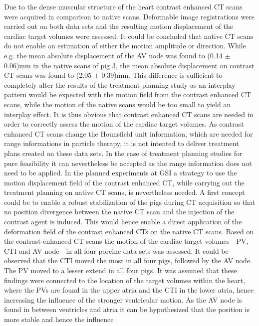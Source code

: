 \documentclass[type=dr, dr=rernat, accentcolor=tud7b,colorbacktitle, bigchapter, openright, twoside, 12pt ]{tudthesis}
\begin{document}
Due to the dense muscular structure of the heart contrast enhanced CT scans were acquired in comparison to native scans. Deformable image 
registrations were carried out on both data sets and the resulting motion displacement of the cardiac target volumes were assessed. It 
could be concluded that native CT scans do not enable an estimation of either the motion amplitude or direction. While e.g. the mean absolute displacement 
of the AV node was found to (0.14 $\pm$ 0.06)mm in the native scans of pig 3, the mean absolute displacement on contrast CT scans was found to 
(2.05 $\pm$ 0.39)mm. This difference is sufficient to completely alter the results of the treatment planning study as
an interplay pattern would be expected with the motion field from the contrast enhanced CT scans, while the motion of the native scans would 
be too small to yield an interplay effect. 
It is thus obvious that contrast enhanced CT scans are needed in order to correctly assess the motion of the cardiac target volumes. 
As contrast enhanced CT scans change the Hounsfield unit information, which are needed for range informations in particle therapy, it is 
not intented to deliver treatment plans created on these data sets. In the case of treatment planning studies for pure feasibility  
it can nevertheless be accepted as the range information does not need to be applied. In the planned experiments at GSI a strategy to use 
the motion displacement field of the contrast enhanced CT, while carrying out the treatment planning on native CT scans, is nevertheless needed. 
A first concept could be to enable a robust stabilization of the pigs during CT acquisition so that no position divergence between the native 
CT scan and the injection of the contrast agent is induced. This would hence enable a direct application of the 
deformation field of the contrast enhanced CTs on the native CT scans.\newline
\newline
Based on the contrast enhanced CT scans the motion of the cardiac target volumes - PV, CTI and AV node - in all four porcine 
data sets was assessed. It could be observed that the CTI moved the most in all four pigs, followed by the AV node. The PV moved to a lesser 
extend in all four pigs. It was assumed that these findings were connected to the location of the target volumes within the heart, where 
the PVs are found in the upper atria and the CTI in the lower atria, hence increasing the influence of the stronger ventricular motion. 
As the AV node is found in between ventricles and atria it can be hypothesized that the position is more stable and hence the influence 
\end{document}
